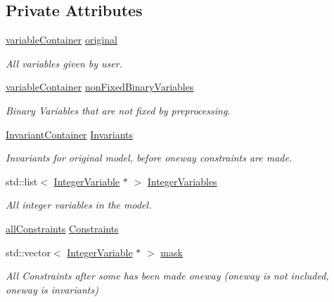 \subsection*{Private Attributes}
\begin{DoxyCompactItemize}
\item 
\hyperlink{_constants_8hpp_a30d6ea0a65b32e8b74cc6126cea9852e}{variable\-Container} \hyperlink{class_model_ad313212f7d87f5b57c0a50fe1bc8ab64}{original}
\begin{DoxyCompactList}\small\item\em All variables given by user. \end{DoxyCompactList}\item 
\hyperlink{_constants_8hpp_a30d6ea0a65b32e8b74cc6126cea9852e}{variable\-Container} \hyperlink{class_model_ab5c91a03f63f4d70ca6310e38b7d0f60}{non\-Fixed\-Binary\-Variables}
\begin{DoxyCompactList}\small\item\em Binary Variables that are not fixed by preprocessing. \end{DoxyCompactList}\item 
\hyperlink{_constants_8hpp_a5ea9d0c2efe357d2a7f5bcd80cdf179a}{Invariant\-Container} \hyperlink{class_model_a7523e3ea7a5c057d7570dbf7b1cfc9b5}{Invariants}
\begin{DoxyCompactList}\small\item\em Invariants for original model, before oneway constraints are made. \end{DoxyCompactList}\item 
std\-::list$<$ \hyperlink{class_integer_variable}{Integer\-Variable} $\ast$ $>$ \hyperlink{class_model_a64bcd8c173f44f76e0217fdcbf92d8eb}{Integer\-Variables}
\begin{DoxyCompactList}\small\item\em All integer variables in the model. \end{DoxyCompactList}\item 
\hyperlink{_constants_8hpp_a9cd92c30962a3af393035610635972fa}{all\-Constraints} \hyperlink{class_model_aca46427b888eb4564749efc4a305ec50}{Constraints}
\item 
std\-::vector$<$ \hyperlink{class_integer_variable}{Integer\-Variable} $\ast$ $>$ \hyperlink{class_model_a4f7c982b83cb72cd28962e5259d18467}{mask}
\begin{DoxyCompactList}\small\item\em All Constraints after some has been made oneway (oneway is not included, oneway is invariants) \end{DoxyCompactList}\end{DoxyCompactItemize}


